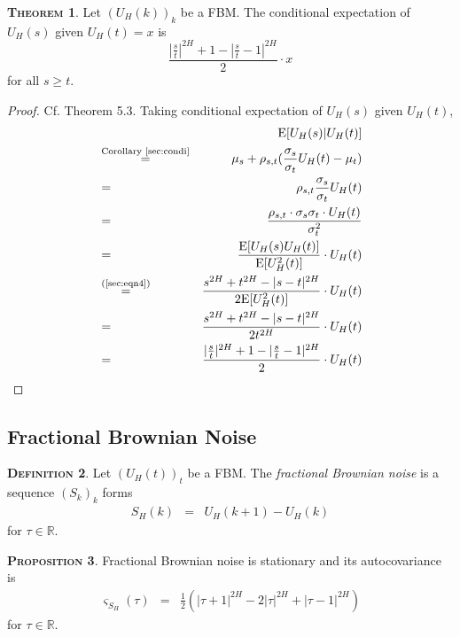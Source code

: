 \documentclass[a4paper, twoside, 11pt]{article}
\theoremstyle{definition}
\newtheorem{definition}{\scshape Definition}[section]
\newtheorem{theorem}[definition]{\scshape Theorem}
\newtheorem{proposition}[definition]{\scshape Proposition}
\begin{document}
\begin{theorem}
  Let $(U_H(k))_{k}$ be a FBM. The conditional expectation of $U_H(s)$  given $U_H(t)=x$ is
\begin{equation*}
  \frac{|\frac{s}{t}|^{2H} + 1 - |\frac{s}{t} - 1|^{2H}}{2} \cdot x
\end{equation*}
for all $ s \ge t$.
\end{theorem}
\begin{proof}
  Cf. \cite{mandelbrot} Theorem 5.3. Taking conditional expectation of $U_H(s)$ given $U_H(t)$,
  \begin{eqnarray*}
  &&\mathrm{E}[U_H(s)|U_H(t)]\\
  &\overset{\text{Corollary \ref{sec:condi}}}{=}& \mu_s + \rho_{s,t} (\frac{\sigma_s}{\sigma_t}U_H(t) - \mu_t)\\
  &=& \rho_{s,t}\frac{\sigma_s}{\sigma_t}U_H(t)\\
  &=& \frac{\rho_{s,t}\cdot\sigma_s\sigma_t\cdot U_H(t)}{\sigma_t^2}\\
  &=& \frac{\mathrm{E}[U_H(s)U_H(t)]}{\mathrm{E}[U_H^2(t)]} \cdot U_H(t)\\
  &\overset{\text{(\ref{sec:eqn4})}}{=}& \frac{s^{2H} + t^{2H} - |s-t|^{2H}}{2\mathrm{E}[U_H^2(t)]}\cdot U_H(t)\\
  &=&  \frac{s^{2H} + t^{2H} - |s-t|^{2H}}{2t^{2H}}\cdot U_H(t)\\
  &=& \frac{|\frac{s}{t}|^{2H} + 1 - |\frac{s}{t} - 1|^{2H}}{2} \cdot U_H(t)
  \end{eqnarray*}
\end{proof}

\subsection{Fractional Brownian Noise}
\begin{definition}
  Let $(U_H(t))_t$ be a FBM. The \emph{fractional Brownian noise} is a sequence $(S_k)_k$ forms
\begin{eqnarray*}
  S_H(k) &=& U_H(k+1) - U_H(k)
\end{eqnarray*}
for $\tau \in \mathbb{R}$.
\end{definition}
\begin{proposition}
  Fractional Brownian noise is stationary and its autocovariance is 
  \begin{eqnarray}
	\varsigma_{S_H}(\tau) &=&  \frac{1}{2} (|\tau + 1|^{2H} - 2|\tau|^{2H} + |\tau-1|^{2H})
  \label{sec:auto}
  \end{eqnarray}
  for $\tau \in \mathbb{R}$.
\end{proposition}
\end{document}

